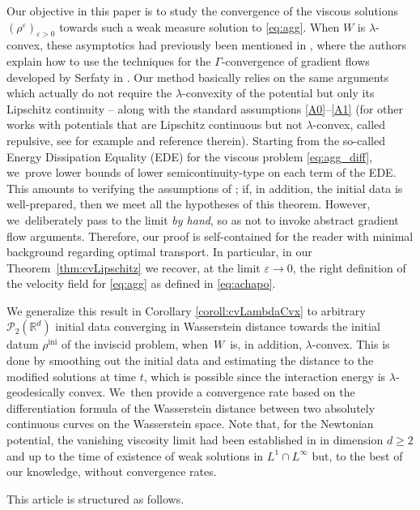 \documentclass[JEP,XML,SOM,Unicode, NoFloatCountersInSection,published]{cedram}
\newcommand{\ini}{\mathrm{ini}}
\def\RR{\mathbb{R}}
\def\eps{\varepsilon}
\def\calP{{\mathcal P}}
\theoremstyle{plain}
\theoremstyle{definition}
\begin{document}
Our objective in this paper is to study the convergence of the viscous solutions $(\rho^\eps)_{\eps>0}$ towards such a weak measure solution to \eqref{eq:agg}. When $W$ is $\lambda$-convex, these asymptotics had previously been mentioned in \cite{carrilloReview18}, where the authors explain how to use the techniques for the $\Gamma$-convergence of gradient flows developed by Serfaty in \cite{serfaty10}. Our method basically relies on the same arguments which actually do not require the $\lambda$-convexity of the potential but only its Lipschitz continuity -- along with the standard assumptions \eqref{A0}--\eqref{A1} (for other works with potentials that are Lipschitz continuous but not $\lambda$-convex, called repulsive, see for example \cite{raoul} and reference therein). Starting from the so-called Energy Dissipation Equality (EDE) for the viscous problem \eqref{eq:agg_diff}, we~prove lower bounds of lower semicontinuity-type on each term of the EDE. This amounts to verifying the assumptions of \cite[Th.\,2]{serfaty10}; if, in addition, the initial data is well-prepared, then we meet all the hypotheses of this theorem. However, we~deliberately pass to the limit \textit{by hand}, so as not to invoke abstract gradient flow arguments. Therefore, our proof is self-contained for the reader with minimal background regarding optimal transport. In particular, in our Theorem~\ref{thm:cvLipschitz} we recover, at the limit $\eps \to 0$, the right definition of the velocity field for \eqref{eq:agg} as defined in \eqref{eq:achapo}.

We generalize this result in Corollary \ref{coroll:cvLambdaCvx} to arbitrary $\calP_2(\RR^d)$ initial data converging in Wasserstein distance towards the initial datum $\rho^{\ini}$ of the inviscid problem, when~$W$~is, in addition, $\lambda$-convex. This is done by smoothing out the initial data and estimating the distance to the modified solutions at time $t$, which is possible since the interaction energy is $\lambda$-geodesically convex. We~then provide a convergence rate based on the differentiation formula of the Wasserstein distance between two absolutely continuous curves on the Wasserstein space. Note that, for the Newtonian potential, the vanishing viscosity limit had been established in \cite{cozzi16} in dimension $d \geq 2$ and up to the time of existence of weak solutions in $L^1 \cap L^\infty$ but, to the best of our knowledge, without convergence rates.

This article is structured as follows.\enlargethispage{.5\baselineskip}%
\end{document}
